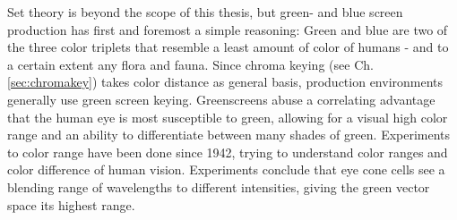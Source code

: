 Set theory is beyond the scope of this thesis, but green- and blue screen 
production has first and foremost a simple reasoning: Green and blue are two of 
the three color triplets that resemble a least amount of color of humans - and 
to a certain extent any flora and fauna. Since chroma keying (see Ch. 
\ref{sec:chromakey}) takes color distance as general basis, production 
environments generally use green screen keying.
\newline
Greenscreens abuse a correlating advantage that the human eye is most 
susceptible to green, allowing for a visual high color range and an ability to 
differentiate between many shades of green. Experiments to color range have 
been done since 1942, trying to understand color ranges and color difference of 
human vision. Experiments conclude that eye cone cells see a blending range of 
wavelengths to different intensities, giving the green vector space its highest 
range. \cite{MacAdam:1942}

